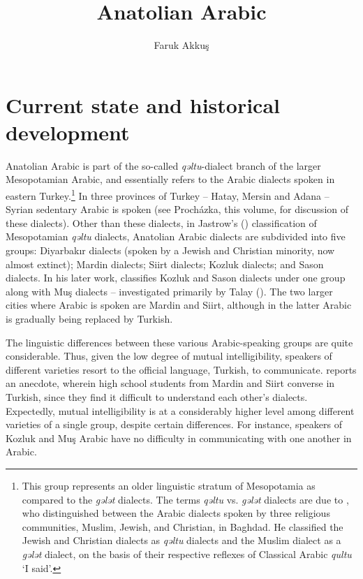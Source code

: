 \documentclass[output=paper]{langsci/langscibook}
\title{Anatolian Arabic}
\author{Faruk Akkuş\affiliation{University of Pennsylvania}}
\begin{document}
\maketitle

\section{Current state and historical development} 
     
Anatolian Arabic is part of the so-called \textit{qəltu}-dialect branch of the larger Mesopotamian Arabic, and essentially refers to the Arabic dialects spoken in eastern Turkey.\footnote{This group represents an older linguistic stratum of Mesopotamia as compared to the \textit{gələt} dialects. The terms \textit{qəltu} vs. \textit{gələt} dialects are due to \cite{Blanc1964}, who distinguished between the Arabic dialects spoken by three religious communities,
Muslim, Jewish, and Christian, in Baghdad. He classified the Jewish and
Christian dialects as \textit{qəltu} dialects and the Muslim dialect as a \textit{gələt} dialect, on the basis of their respective reflexes of Classical Arabic \textit{qultu} `I said'.} In three provinces of Turkey -- Hatay, Mersin and Adana -- Syrian sedentary Arabic is spoken (see Proch\'{a}zka, this volume, for discussion of these dialects). Other than these dialects, in Jastrow's (\citeyear{Jastrow1978}) classification of Mesopotamian \textit{qəltu} dialects, Anatolian Arabic dialects are subdivided into five groups:
Diyarbak{\i}r dialects (spoken by a Jewish and Christian minority, now almost extinct); Mardin dialects; Siirt dialects; Kozluk dialects; and Sason dialects.
In his later work, \citet{Jastrow2011anatolian} classifies Kozluk and Sason dialects under one group along with Mu\c{s} dialects -- investigated primarily by Talay (\citeyear{Talay2001,Talay2002}). The two larger cities where Arabic is spoken are Mardin and Siirt, although in the latter Arabic is gradually being replaced by Turkish. 

The linguistic differences between these various Arabic-speaking groups are quite considerable. Thus, given the low degree of mutual intelligibility, speakers of different varieties resort to the official language, Turkish, to communicate. \citet{Jastrow2006} reports an anecdote, wherein high school students from Mardin and Siirt converse in Turkish, since they find it difficult to understand each other's dialects. Expectedly, mutual intelligibility is at a considerably higher level among different varieties of a single group, despite certain differences. For instance,  speakers of Kozluk and Mu\c{s} Arabic have no difficulty in communicating with one another in Arabic. 
\end{document}
